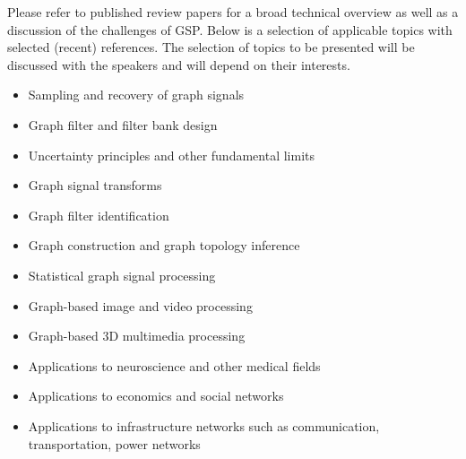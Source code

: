 \documentclass[a4paper]{scrartcl}
\begin{document}
Please refer to published review papers \cite{shuman_emerging_2013,
sandryhaila_discrete_2014, coifman_diffusion_2006, ekambaram_circulant_2013} for
a broad technical overview as well as a discussion of the challenges of GSP.
Below is a selection of applicable topics with selected (recent) references. The
selection of topics to be presented will be discussed with the speakers and will
depend on their interests.
\begin{itemize}
	\setlength{\itemsep}{0pt} \setlength{\parskip}{0pt}
	\item Sampling and recovery of graph signals \cite{puy2015random,tsitsvero2015signals,anis2014towards}
	\item Graph filter and filter bank design \cite{hammond2011wavelets,narang_bior_filters,ekambaram_globalsip,leonardi_multislice,leonardi_fmri,shuman2013spectrum}
	\item Uncertainty principles and other fundamental limits \cite{perraudin2016global,agaskar_spie,pasdeloup}
	\item Graph signal transforms \cite{szlam,gavish,Maggioni_biorthogonal,coifman_diffusion_2006,lafon_coarse,narang_lifting_graphs}
	\item Graph filter identification \cite{thanou_TSP_2014}
	\item Graph construction and graph topology inference \cite{kalofolias2016learn,Dong:2014tj}
	\item Statistical graph signal processing \cite{perraudin2016stationary,zhang2015graph,gadde2015probabilistic}
	\item Graph-based image and video processing \cite{elmoataz2008nonlocal,lezoray2008nonlocal,shahid2015fast}
	\item Graph-based 3D multimedia processing \cite{zhang2014fast,
		schoenenberger2015graph}
	\item Applications to neuroscience and other medical fields \cite{huang2015graph,hu2015spectral}
	\item Applications to economics and social networks
	\item Applications to infrastructure networks such as communication, transportation, power networks \cite{mcgraw,jain2014big,borgnat2011shared}

\end{itemize}
\end{document}
